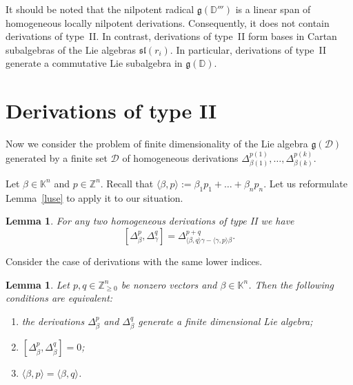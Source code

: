 \documentclass[a4paper, 12pt,oneside,reqno]{amsart}
\numberwithin{equation}{section}
\newtheorem{lemma}[theorem]{Lemma}
\theoremstyle{definition}
\begin{document}
It should be noted that the nilpotent radical $\mathfrak{g}(\mathbb{D}''')$ is a linear span of homogeneous locally nilpotent derivations. Consequently, it does not contain derivations of type~II. In contrast, derivations of type~II form bases in Cartan subalgebras of the Lie algebras $\mathfrak{sl}(r_i)$. In particular, derivations of type~II generate a commutative Lie subalgebra in $\mathfrak{g}(\mathbb{D})$. 

\section{Derivations of type II}
\label{s3}
Now we consider the problem of finite dimensionality of the Lie algebra $\mathfrak{g}(\mathcal{D})$ generated by a finite set $\mathcal{D}$ of homogeneous derivations 
$\Delta^{p(1)}_{\beta(1)},\ldots,\Delta^{p(k)}_{\beta(k)}$. 

Let $\beta\in\mathbb{K}^n$ and $p\in\mathbb{Z}^n$. Recall that $\langle\beta,p\rangle:=\beta_1p_1+\ldots+\beta_np_n$.  Let us reformulate Lemma~\ref{luse} to apply it to our situation.

\begin{lemma} \label{l1}
For any two homogeneous derivations of type II we have
$$
[\Delta^p_{\beta},\Delta^q_{\gamma}]=\Delta^{p+q}_{\langle\beta,q\rangle\gamma-\langle\gamma,p\rangle\beta}.
$$
\end{lemma}

Consider the case of derivations with the same lower indices. 

\begin{lemma} \label{l2}
Let $p,q\in\mathbb{Z}^n_{\ge 0}$ be nonzero vectors and $\beta\in\mathbb{K}^n$. Then the following conditions are equivalent:
\begin{enumerate}
\item[{\rm (i)}]
the derivations $\Delta^p_{\beta}$ and $\Delta^q_{\beta}$ generate a finite dimensional Lie algebra; 
\item[{\rm (ii)}]
$[\Delta^p_{\beta}, \Delta^q_{\beta}]=0$;
\item[{\rm (iii)}] 
$\langle\beta,p\rangle=\langle\beta,q\rangle$. 
\end{enumerate}
\end{lemma}
\end{document}
